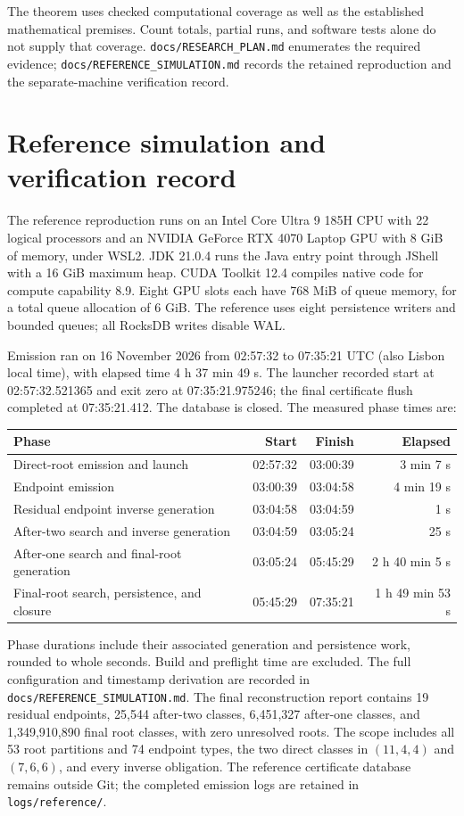 \documentclass[11pt,a4paper]{article}
\begin{document}
The theorem uses checked computational coverage as well as the established
mathematical premises. Count totals, partial runs, and software tests alone do
not supply that coverage. \nolinkurl{docs/RESEARCH_PLAN.md} enumerates the
required evidence; \nolinkurl{docs/REFERENCE_SIMULATION.md} records the retained
reproduction and the separate-machine verification record.

\section{Reference simulation and verification record}
The reference reproduction runs on an Intel Core Ultra 9 185H CPU with
22 logical processors and an NVIDIA GeForce RTX 4070 Laptop GPU with 8 GiB
of memory, under WSL2. JDK 21.0.4 runs the Java entry point through JShell
with a 16 GiB maximum heap. CUDA Toolkit 12.4 compiles native code for
compute capability 8.9. Eight GPU slots each have 768 MiB of queue memory,
for a total queue allocation of 6 GiB. The reference uses eight persistence
writers and bounded queues; all RocksDB writes disable WAL.

Emission ran on 16 November 2026 from 02:57:32 to 07:35:21 UTC
(also Lisbon local time), with elapsed time 4 h 37 min 49 s. The launcher
recorded start at 02:57:32.521365 and exit zero at 07:35:21.975246;
the final certificate flush completed at 07:35:21.412. The database is closed.
The measured phase times are:
\begin{center}\small
\begin{tabular}{@{}lrrr@{}}
\toprule Phase & Start & Finish & Elapsed\\\midrule
Direct-root emission and launch & 02:57:32 & 03:00:39 & 3 min 7 s\\
Endpoint emission & 03:00:39 & 03:04:58 & 4 min 19 s\\
Residual endpoint inverse generation & 03:04:58 & 03:04:59 & 1 s\\
After-two search and inverse generation & 03:04:59 & 03:05:24 & 25 s\\
After-one search and final-root generation & 03:05:24 & 05:45:29 & 2 h 40 min 5 s\\
Final-root search, persistence, and closure & 05:45:29 & 07:35:21 & 1 h 49 min 53 s\\
\bottomrule
\end{tabular}\end{center}
Phase durations include their associated generation and persistence work,
rounded to whole seconds. Build and preflight time are excluded. The full
configuration and timestamp derivation are recorded in
\nolinkurl{docs/REFERENCE_SIMULATION.md}. The final reconstruction report
contains 19 residual endpoints, 25,544 after-two classes, 6,451,327 after-one
classes, and 1,349,910,890 final root classes, with zero unresolved roots.
The scope includes all 53 root partitions and 74 endpoint types, the two direct
classes in $(11,4,4)$ and $(7,6,6)$, and every inverse obligation. The reference
certificate database remains outside Git; the completed emission logs are
retained in \nolinkurl{logs/reference/}.
\end{document}
